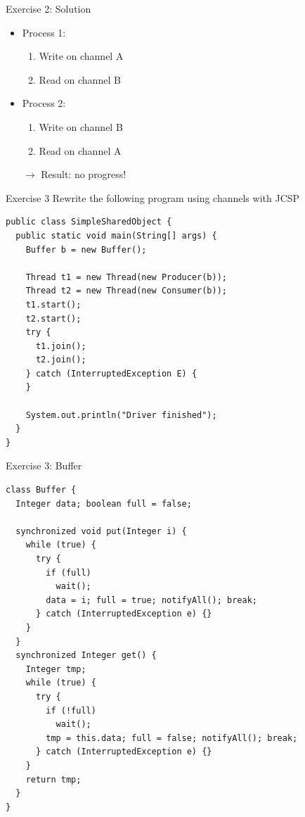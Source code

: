 \begin{frame}{Exercise 2: Solution}
  \begin{itemize}
  \item Process 1:
    \begin{enumerate}
    \item Write on channel A
    \item Read on channel B
    \end{enumerate}
  \item Process 2:
    \begin{enumerate}
    \item Write on channel B
    \item Read on channel A
    \end{enumerate}
  \item[$\rightarrow$] Result: no progress!
  \end{itemize}
\end{frame}

\begin{frame}[fragile]{Exercise 3}
  Rewrite the following program using channels with JCSP


\begin{lstlisting}[basicstyle=\fontsize{9}{11}\selectfont\ttfamily]
public class SimpleSharedObject {
  public static void main(String[] args) {
    Buffer b = new Buffer();

    Thread t1 = new Thread(new Producer(b));
    Thread t2 = new Thread(new Consumer(b));
    t1.start();
    t2.start();
    try {
      t1.join();
      t2.join();
    } catch (InterruptedException E) {
    }

    System.out.println("Driver finished");
  }
}
\end{lstlisting}
\end{frame}

\begin{frame}[fragile]{Exercise 3: Buffer}
\begin{lstlisting}[basicstyle=\fontsize{7}{9}\selectfont\ttfamily]
class Buffer {
  Integer data; boolean full = false;

  synchronized void put(Integer i) {
    while (true) {
      try {
        if (full)
          wait();
        data = i; full = true; notifyAll(); break;
      } catch (InterruptedException e) {}
    }
  }
  synchronized Integer get() {
    Integer tmp;
    while (true) {
      try {
        if (!full)
          wait();
        tmp = this.data; full = false; notifyAll(); break;
      } catch (InterruptedException e) {}
    }
    return tmp;
  }
}
\end{lstlisting}
\end{frame}

